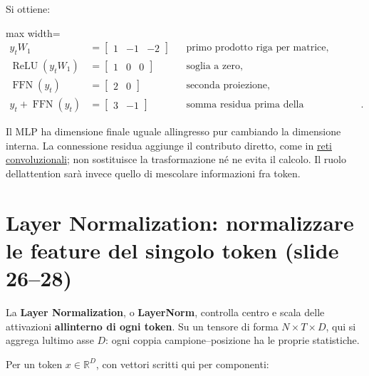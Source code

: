 \documentclass[11pt,a4paper,oneside,openany]{book}
\begin{document}
Si ottiene:

\begin{center}
\begin{adjustbox}{max width=\linewidth}
$\displaystyle 
\begin{aligned}
y_tW_1&=\begin{bmatrix}1&-1&-2\end{bmatrix}
&&\text{primo prodotto riga per matrice},\\
\operatorname{ReLU}(y_tW_1)&=\begin{bmatrix}1&0&0\end{bmatrix}
&&\text{soglia a zero},\\
\operatorname{FFN}(y_t)&=\begin{bmatrix}2&0\end{bmatrix}
&&\text{seconda proiezione},\\
y_t+\operatorname{FFN}(y_t)&=\begin{bmatrix}3&-1\end{bmatrix}
&&\text{somma residua prima della normalizzazione}.
\end{aligned}
$
\end{adjustbox}
\end{center}

Il MLP ha dimensione finale uguale all\textquotesingle ingresso pur cambiando la dimensione interna. La connessione residua aggiunge il contributo diretto, come in \hyperref[fonte02]{reti convoluzionali}; non sostituisce la trasformazione né ne evita il calcolo. Il ruolo dell\textquotesingle attention sarà invece quello di mescolare informazioni fra token.

\section{Layer Normalization: normalizzare le feature del singolo token (slide 26--28)}\label{f04-r394}

La \textbf{Layer Normalization}, o \textbf{LayerNorm}, controlla centro e scala delle attivazioni \textbf{all\textquotesingle interno di ogni token}. Su un tensore di forma \(N\times T\times D\), qui si aggrega l\textquotesingle ultimo asse \(D\): ogni coppia campione--posizione ha le proprie statistiche.

Per un token \(x\in\mathbb R^D\), con vettori scritti qui per componenti:
\end{document}
